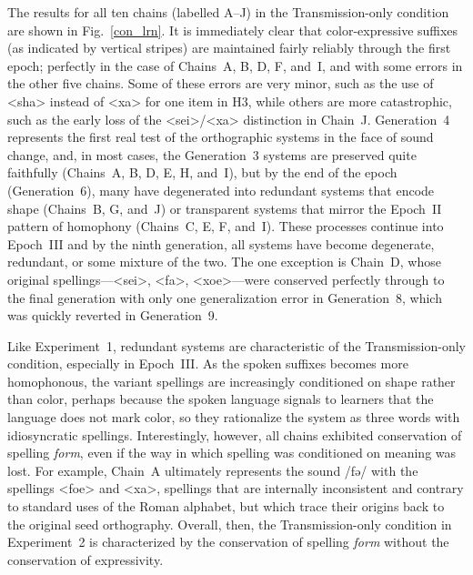 \documentclass[doc,biblatex]{apa7}
\begin{document}
The results for all ten chains (labelled A--J) in the Transmission-only condition are shown in Fig.~\ref{con_lrn}. It is immediately clear that color-expressive suffixes (as indicated by vertical stripes) are maintained fairly reliably through the first epoch; perfectly in the case of Chains~A, B, D, F, and~I, and with some errors in the other five chains. Some of these errors are very minor, such as the use of <sha> instead of <xa> for one item in H3, while others are more catastrophic, such as the early loss of the <sei>/<xa> distinction in Chain~J. Generation~4 represents the first real test of the orthographic systems in the face of sound change, and, in most cases, the Generation~3 systems are preserved quite faithfully (Chains~A, B, D, E, H, and~I), but by the end of the epoch (Generation~6), many have degenerated into redundant systems that encode shape (Chains~B, G, and~J) or transparent systems that mirror the Epoch~II pattern of homophony (Chains~C, E, F, and~I). These processes continue into Epoch~III and by the ninth generation, all systems have become degenerate, redundant, or some mixture of the two. The one exception is Chain~D, whose original spellings---<sei>, <fa>, <xoe>---were conserved perfectly through to the final generation with only one generalization error in Generation~8, which was quickly reverted in Generation~9.

Like Experiment~1, redundant systems are characteristic of the Transmission-only condition, especially in Epoch~III. As the spoken suffixes becomes more homophonous, the variant spellings are increasingly conditioned on shape rather than color, perhaps because the spoken language signals to learners that the language does not mark color, so they rationalize the system as three words with idiosyncratic spellings. Interestingly, however, all chains exhibited conservation of spelling \textit{form}, even if the way in which spelling was conditioned on meaning was lost. For example, Chain~A ultimately represents the sound /fə/ with the spellings <foe> and <xa>, spellings that are internally inconsistent and contrary to standard uses of the Roman alphabet, but which trace their origins back to the original seed orthography. Overall, then, the Transmission-only condition in Experiment~2 is characterized by the conservation of spelling \textit{form} without the conservation of expressivity.
\end{document}
